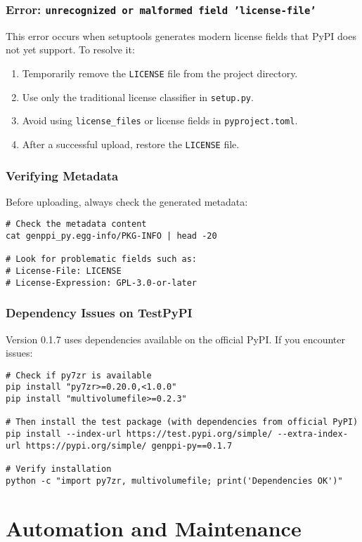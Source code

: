 \documentclass[11pt, a4paper]{article}
\begin{document}
\subsubsection{Error: \texttt{unrecognized or malformed field 'license-file'}}
This error occurs when setuptools generates modern license fields that PyPI does not yet support. To resolve it:
\begin{enumerate}
    \item Temporarily remove the \texttt{LICENSE} file from the project directory.
    \item Use only the traditional license classifier in \texttt{setup.py}.
    \item Avoid using \texttt{license\_files} or license fields in \texttt{pyproject.toml}.
    \item After a successful upload, restore the \texttt{LICENSE} file.
\end{enumerate}

\subsubsection{Verifying Metadata}
Before uploading, always check the generated metadata:
\begin{lstlisting}[style=bashstyle]
# Check the metadata content
cat genppi_py.egg-info/PKG-INFO | head -20

# Look for problematic fields such as:
# License-File: LICENSE
# License-Expression: GPL-3.0-or-later
\end{lstlisting}

\subsubsection{Dependency Issues on TestPyPI}
Version 0.1.7 uses dependencies available on the official PyPI. If you encounter issues:
\begin{lstlisting}[style=bashstyle]
# Check if py7zr is available
pip install "py7zr>=0.20.0,<1.0.0"
pip install "multivolumefile>=0.2.3"

# Then install the test package (with dependencies from official PyPI)
pip install --index-url https://test.pypi.org/simple/ --extra-index-url https://pypi.org/simple/ genppi-py==0.1.7

# Verify installation
python -c "import py7zr, multivolumefile; print('Dependencies OK')"
\end{lstlisting}

\section{Automation and Maintenance}
\end{document}
